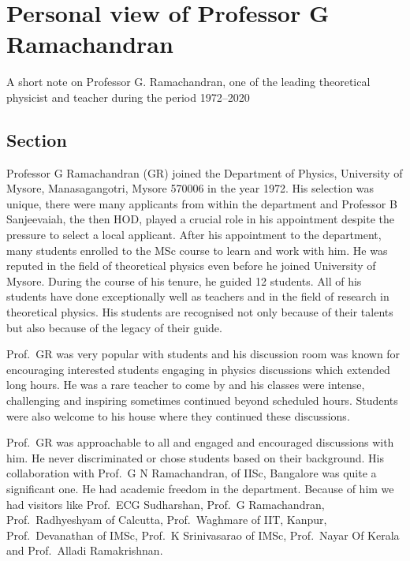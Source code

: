 \chapter{Personal view of Professor G Ramachandran}\label{chap19}


A short note on Professor G. Ramachandran, one of the leading theoretical physicist and teacher during the period 1972--2020

\section{Section}

Professor G Ramachandran (GR) joined the Department of Physics, University of Mysore, Manasagangotri, Mysore
570006 in the year 1972. His selection was unique, there were many applicants from within the department
and Professor B Sanjeevaiah, the then HOD, played a crucial role in his appointment despite the pressure to
select a local applicant. After his appointment to the department, many students enrolled to the MSc course to
learn and work with him. He was reputed in the field of theoretical physics even before he joined University of
Mysore. During the course of his tenure, he guided 12 students. All of his students have done exceptionally well
as teachers and in the field of research in theoretical physics. His students are recognised not only because of
their talents but also because of the legacy of their guide.

Prof.\ GR was very popular with students and his discussion room was known for encouraging interested students
engaging in physics discussions which extended long hours. He was a rare teacher to come by and his classes were
intense, challenging and inspiring sometimes continued beyond scheduled hours. Students were also welcome to
his house where they continued these discussions.
\newpage

Prof.\ GR was approachable to all and engaged and encouraged discussions with him. He never discriminated
or chose students based on their background. His collaboration with Prof.\ G N Ramachandran, of IISc, Bangalore was quite a significant one. He had academic freedom in the department. Because of him we had visitors like Prof.\ ECG Sudharshan, Prof.\ G Ramachandran, Prof.\ Radhyeshyam of Calcutta, Prof.\ Waghmare of IIT,
Kanpur, Prof.\ Devanathan of IMSc, Prof.\ K Srinivasarao of IMSc, Prof.\ Nayar Of Kerala and Prof.\ Alladi Ramakrishnan.

